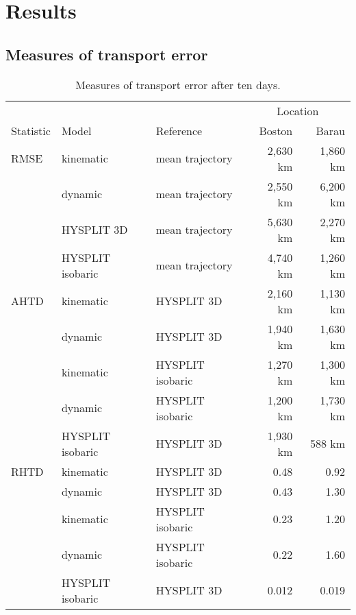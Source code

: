 \chapter{Results}

\section{Measures of transport error}

\begin{table}
    \centering
    \caption{Measures of transport error after ten days.}    
    \begin{tabular}{ l l l r r }
        \hline
        \hline
        			&				&				& 	\multicolumn{2}{c}{Location} \\
	\cline{4-5}
        Statistic 	& Model 			& Reference 		& Boston 		& Barau		\\
        \hline
        RMSE	& kinematic 		& mean trajectory	& 2,630 km	& 1,860 km	\\
        		 	& dynamic 		& mean trajectory	& 2,550 km	& 6,200 km	\\
			& HYSPLIT 3D 		& mean trajectory	& 5,630 km	& 2,270 km	\\
        		 	& HYSPLIT isobaric 	& mean trajectory	& 4,740 km	& 1,260 km	\\
        AHTD 	& kinematic		& HYSPLIT 3D		& 2,160 km	& 1,130 km	\\
        		 	& dynamic			& HYSPLIT 3D 		& 1,940 km	& 1,630 km	\\
        		 	& kinematic		& HYSPLIT isobaric  & 1,270 km	& 1,300 km	\\
        		 	& dynamic			& HYSPLIT isobaric  & 1,200 km	& 1,730 km	\\
			& HYSPLIT isobaric	& HYSPLIT 3D 		& 1,930 km	& 588 km		\\
        RHTD 	& kinematic		& HYSPLIT 3D		& 0.48		& 0.92		\\
        		 	& dynamic			& HYSPLIT 3D 		& 0.43		& 1.30		\\
        		 	& kinematic		& HYSPLIT isobaric  & 0.23		& 1.20		\\
        		 	& dynamic			& HYSPLIT isobaric  & 0.22		& 1.60		\\
			& HYSPLIT isobaric	& HYSPLIT 3D 		& 0.012		& 0.019		\\	
        \hline
    \end{tabular}
\end{table}